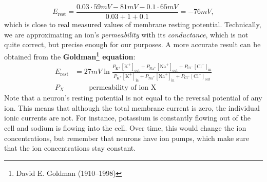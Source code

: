 \begin{equation*}
E_\mathrm{rest} = \frac{0.03 \cdot 59\si{mV} - 81 \si{mV} - 0.1 \cdot 65 \si{mV}}{0.03 + 1 + 0.1}=-76\si{mV},
\end{equation*}
which is close to real measured values of membrane resting potential. Technically, we are approximating an ion's \textit{permeability} with its \textit{conductance}, which is not quite correct, but precise enough for our purposes. A more accurate result can be obtained from the \textbf{Goldman\footnote{David E. Goldman (1910--1998)} equation}:
\begin{align*}
E_\mathrm{rest} &= 27\si{mV} \ln \frac{P_{\text{K}^+}[{\text{K}^+}]_\mathrm{out} + P_{\text{Na}^+}[{\text{Na}^+}]_\mathrm{out} + P_{\text{Cl}^-}[{\text{Cl}^-}]_\mathrm{in}}{P_{\text{K}^+}[{\text{K}^+}]_\mathrm{in} + P_{\text{Na}^+}[{\text{Na}^+}]_\mathrm{in} + P_{\text{Cl}^-}[{\text{Cl}^-}]_\mathrm{out}}\\
P_X &\qquad \text{permeability of ion X}
\end{align*}
Note that a neuron's resting potential is not equal to the reversal potential of any ion. This means that although the total membrane current is zero, the individual ionic currents are not. For instance, potassium is constantly flowing out of the cell and sodium is flowing into the cell. Over time, this would change the ion concentrations, but remember that neurons have ion pumps, which make sure that the ion concentrations stay constant.

